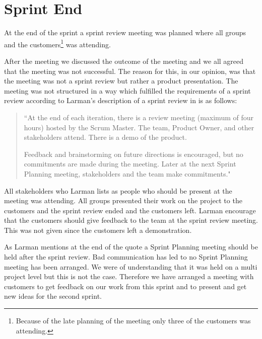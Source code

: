 \section{Sprint End}
At the end of the sprint a sprint review meeting was planned where all groups and the customers\footnote{Because of the late planning of the meeting only three of the customers was attending.} was attending.

After the meeting we discussed the outcome of the meeting and we all agreed that the meeting was not successful.
The reason for this, in our opinion, was that the meeting was not a sprint review but rather a product presentation.
The meeting was not structured in a way which fulfilled the requirements of a sprint review according to Larman's description of a sprint review in \cite[p. 71]{larmanAgile} is as follows:
\begin{quote}
``At the end of each iteration, there is a review meeting (maximum of four hours)
hosted by the Scrum Master.
The team, Product Owner, and other stakeholders attend.
There is a demo of the product.

Feedback and brainstorming on future directions is encouraged, but no commitments are made during the meeting.
Later at the next Sprint Planning meeting, stakeholders and the team make commitments."
\end{quote}

All stakeholders who Larman lists as people who should be present at the meeting was attending.
All groups presented their work on the project to the customers and the sprint review ended and the  customers left.
Larman encourage that the customers should give feedback to the team at the sprint review meeting.
This was not given since the customers left a demonstration.

As Larman mentions at the end of the quote a Sprint Planning meeting should be held after the sprint review.
Bad communication has led to no Sprint Planning meeting has been arranged.
We were of understanding that it was held on a multi project level but this is not the case.
Therefore we have arranged a meeting with customers to get feedback on our work from this sprint and to present and get new ideas for the second sprint.

